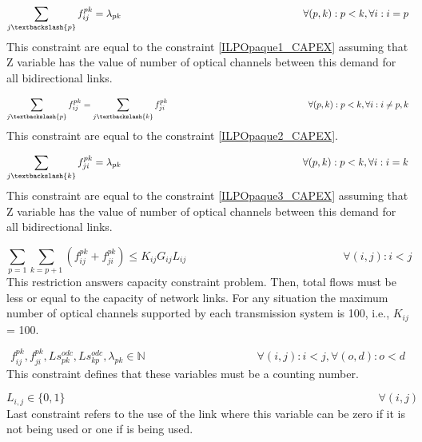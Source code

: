 \begin{equation}
\sum_{j\textbackslash \{p\}} f_{ij}^{pk} = \lambda_{pk}  \qquad \qquad \qquad \qquad \qquad \qquad \qquad \qquad \qquad
\forall(p,k) : p < k, \forall i: i = p
\label{ILPTransluc6}
\end{equation}
\noindent
This constraint are equal to the constraint \ref{ILPOpaque1_CAPEX} assuming that Z variable has the value of number of optical channels between this demand for all bidirectional links.

\begin{equation}
\sum_{j\textbackslash \{p\}} f_{ij}^{pk} = \sum_{j\textbackslash \{k\}} f_{ji}^{pk} \qquad \qquad \qquad \qquad \qquad \qquad \qquad \qquad
\forall(p,k) : p < k, \forall i: i \neq p,k
\label{ILPTransluc7}
\end{equation}
\noindent
This constraint are equal to the constraint \ref{ILPOpaque2_CAPEX}.

\begin{equation}
\sum_{j\textbackslash \{k\}} f_{ji}^{pk} = \lambda_{pk}  \qquad \qquad \qquad \qquad \qquad \qquad \qquad \qquad \qquad
\forall(p,k) : p < k, \forall i: i = k
\label{ILPTransluc8}
\end{equation}
\noindent
This constraint are equal to the constraint \ref{ILPOpaque3_CAPEX} assuming that Z variable has the value of number of optical channels between this demand for all bidirectional links.

\begin{equation}
\sum_{p=1} \sum_{k=p+1} \left( f_{ij}^{pk} + f_{ji}^{pk}\right) \leq K_{ij} G_{ij} L_{ij} \qquad \qquad \qquad \qquad \qquad \qquad \qquad
\forall (i,j) : i < j
\label{ILPTransluc9}
\end{equation}
\noindent
This restriction answers capacity constraint problem. Then, total flows must be less or equal to the capacity of network links. For any situation the maximum number of optical channels supported by each transmission system is 100, i.e., $K_{ij}$ = 100.

\begin{equation}
f_{ij}^{pk} , f_{ji}^{pk} , Ls_{pk}^{odc} , Ls_{kp}^{odc} , \lambda_{pk} \in \mathbb{N}   \qquad \qquad \qquad \qquad \qquad
\forall(i,j) : i < j, \forall(o,d) : o < d
\label{ILPTransluc10}
\end{equation}
\noindent
This constraint defines that these variables must be a counting number.

\begin{equation}
L_{i,j} \in \{0,1\} \qquad \qquad \qquad \qquad \qquad \qquad \qquad \qquad \qquad \qquad \qquad \qquad \qquad \qquad
\forall(i,j)
\label{ILPTransluc11}
\end{equation}
\noindent
Last constraint refers to the use of the link where this variable can be zero if it is not being used or one if is being used.

